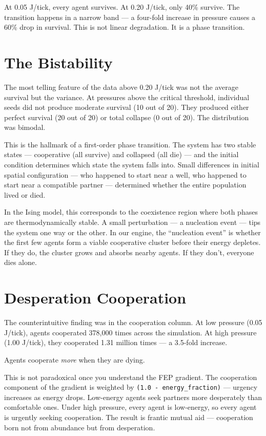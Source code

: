 At 0.05 J/tick, every agent survives. At 0.20 J/tick, only 40\% survive. The transition happens in a narrow band --- a four-fold increase in pressure causes a 60\% drop in survival. This is not linear degradation. It is a phase transition.

\section{The Bistability}\label{the-bistability}

The most telling feature of the data above 0.20 J/tick was not the average survival but the variance. At pressures above the critical threshold, individual seeds did not produce moderate survival (10 out of 20). They produced either perfect survival (20 out of 20) or total collapse (0 out of 20). The distribution was bimodal.

This is the hallmark of a first-order phase transition. The system has two stable states --- cooperative (all survive) and collapsed (all die) --- and the initial condition determines which state the system falls into. Small differences in initial spatial configuration --- who happened to start near a well, who happened to start near a compatible partner --- determined whether the entire population lived or died.

In the Ising model, this corresponds to the coexistence region where both phases are thermodynamically stable. A small perturbation --- a nucleation event --- tips the system one way or the other. In our engine, the ``nucleation event'' is whether the first few agents form a viable cooperative cluster before their energy depletes. If they do, the cluster grows and absorbs nearby agents. If they don't, everyone dies alone.

\section{Desperation Cooperation}\label{desperation-cooperation}

The counterintuitive finding was in the cooperation column. At low pressure (0.05 J/tick), agents cooperated 378,000 times across the simulation. At high pressure (1.00 J/tick), they cooperated 1.31 million times --- a 3.5-fold increase.

Agents cooperate \emph{more} when they are dying.

This is not paradoxical once you understand the FEP gradient. The cooperation component of the gradient is weighted by \texttt{(1.0\ -\ energy\_fraction)} --- urgency increases as energy drops. Low-energy agents seek partners more desperately than comfortable ones. Under high pressure, every agent is low-energy, so every agent is urgently seeking cooperation. The result is frantic mutual aid --- cooperation born not from abundance but from desperation.

